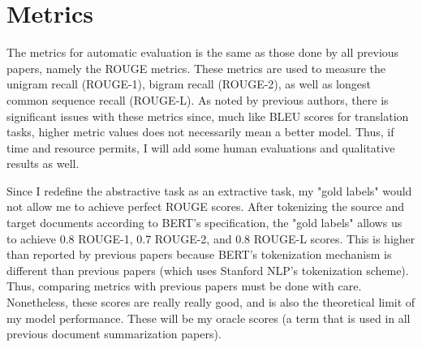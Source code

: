 \documentclass[11pt,a4paper]{article}
\begin{document}
\section{Metrics}
The metrics for automatic evaluation is the same as those done by all previous papers, namely the ROUGE metrics. These metrics are used to measure the unigram recall (ROUGE-1), bigram recall (ROUGE-2), as well as longest common sequence recall (ROUGE-L). As noted by previous authors, there is significant issues with these metrics since, much like BLEU scores for translation tasks, higher metric values does not necessarily mean a better model. Thus, if time and resource permits, I will add some human evaluations and qualitative results as well.

Since I redefine the abstractive task as an extractive task, my "gold labels" would not allow me to achieve perfect ROUGE scores. After tokenizing the source and target documents according to BERT's specification, the "gold labels" allows us to achieve 0.8 ROUGE-1, 0.7 ROUGE-2, and 0.8 ROUGE-L scores. This is higher than reported by previous papers because BERT's tokenization mechanism is different than previous papers (which uses Stanford NLP's tokenization scheme). Thus, comparing metrics with previous papers must be done with care. Nonetheless, these scores are really really good, and is also the theoretical limit of my model performance. These will be my oracle scores (a term that is used in all previous document summarization papers).
\end{document}
